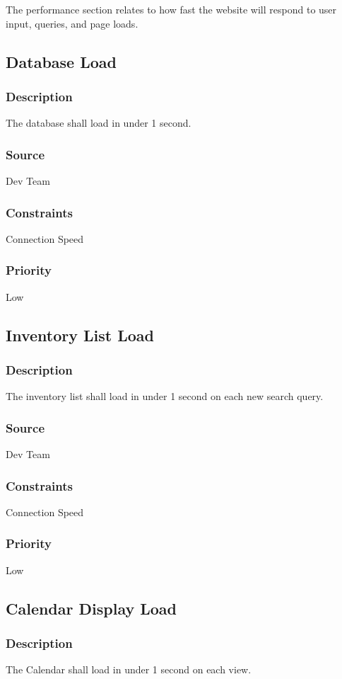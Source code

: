 The performance section relates to how fast the website will respond to user input, queries, and page loads.

\subsection{Database Load}
\subsubsection{Description}
The database shall load in under 1 second.
\subsubsection{Source}
Dev Team
\subsubsection{Constraints}
Connection Speed
\subsubsection{Priority}
Low

\subsection{Inventory List Load}
\subsubsection{Description}
The inventory list shall load in under 1 second on each new search query.
\subsubsection{Source}
Dev Team
\subsubsection{Constraints}
Connection Speed
\subsubsection{Priority}
Low

\subsection{Calendar Display Load}
\subsubsection{Description}
The Calendar shall load in under 1 second on each view.

